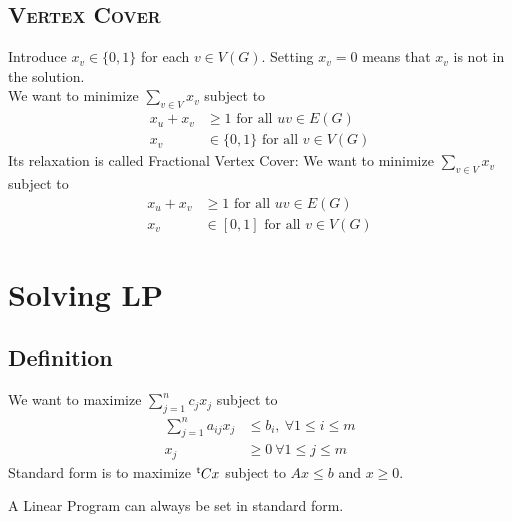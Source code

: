 \documentclass[12pt]{cours}
\begin{document}
\subsection{\textsc{Vertex Cover}}
\begin{proposition}
    Introduce $x_{v} \in \{0, 1\}$ for each $v \in V(G)$. Setting $x_{v} = 0$ means that $x_{v}$ is not in the solution.\\
    We want to minimize $\sum_{v \in V}x_{v}$ subject to
    \[
        \begin{aligned}
            x_{u} + x_{v} &\geq 1 \text{  for all } uv \in E(G)\\
            x_{v} &\in \{0, 1\}  \text{  for all } v \in V(G)
        \end{aligned}
    \]
    Its relaxation is called Fractional Vertex Cover:
    We want to minimize $\sum_{v \in V}x_{v}$ subject to
    \[
        \begin{aligned}
            x_{u} + x_{v} &\geq 1 \text{  for all } uv \in E(G)\\
            x_{v} &\in \left[0, 1\right]  \text{  for all } v \in V(G)
        \end{aligned}
    \]
\end{proposition}

\section{Solving LP}
\subsection{Definition}
\begin{definition}
    We want to maximize $\sum_{j = 1}^{n} c_{j}x_{j}$ subject to
    \[
        \begin{aligned}
            \sum_{j = 1}^{n}a_{ij}x_{j} &\leq b_{i}, \ \forall 1 \leq i \leq m\\
            x_{j} &\geq 0 \ \forall 1 \leq j \leq m
        \end{aligned}
    \]
    Standard form is to maximize ${^{\mathsf{t}}}Cx$ subject to $Ax \leq b$ and $x \geq 0$.\\
\end{definition}

\begin{proposition}
    A Linear Program can always be set in standard form.
\end{proposition}
\end{document}
